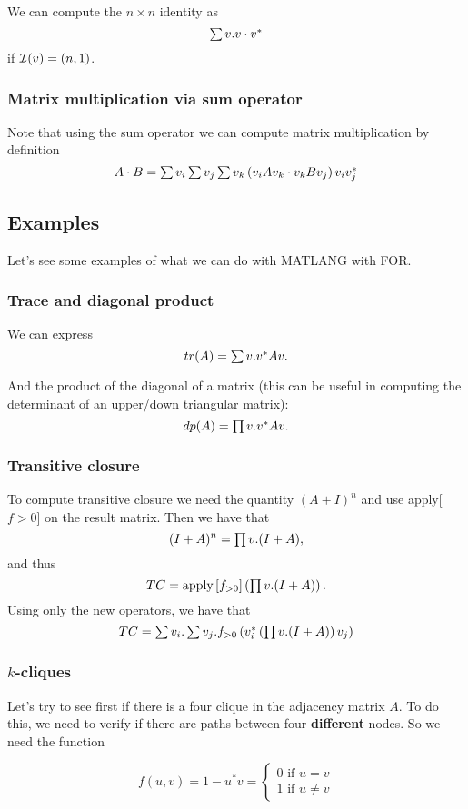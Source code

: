 We can compute the $n\times n$ identity as $$\textstyle\sum v. v \cdot v^*$$ if $\mathcal{I}(v)=(n,1)$.

\subsubsection{Matrix multiplication via sum operator}

Note that using the sum operator we can compute matrix multiplication by definition $$A\cdot B = \textstyle\sum v_i\textstyle\sum v_j\textstyle\sum v_k \left( v_iAv_k\cdot v_kBv_j\right)v_iv_j^*$$

\subsection{Examples}

Let's see some examples of what we can do with MATLANG with FOR.

\subsubsection{Trace and diagonal product}

We can express $$tr(A)=\textstyle\sum v. v^*Av.$$

And the product of the diagonal of a matrix (this can be useful in computing the determinant of an upper/down triangular matrix): $$dp(A)=\textstyle\prod v. v^*Av.$$

\subsubsection{Transitive closure}

To compute transitive closure we need the quantity $(A+I)^n$ and use apply[$f>0$] on the result matrix. Then we have that $$(I+A)^n=\textstyle\prod v. (I+A),$$ and thus $$TC = \text{apply}\left[ f_{>0}\right]\left( \textstyle\prod v. (I+A) \right).$$
Using only the new operators, we have that $$TC=\textstyle\sum v_i. \textstyle\sum v_j. f_{>0}\left(v_i^*\left(\textstyle\prod v. (I+A)\right)v_j\right)$$

\subsubsection{$k$-cliques}

Let's try to see first if there is a four clique in the adjacency matrix $A$. To do this, we need to verify if there are paths between four \textbf{different} nodes. So we need the function 

\[
  			f(u,v)=1-u^*v=\begin{cases}
               0 \text{ if } u=v \\
               1 \text{ if } u\neq v
            \end{cases}
		\]

